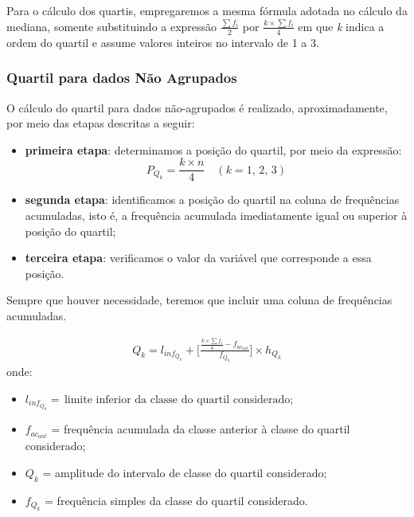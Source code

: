 Para o cálculo dos quartis, empregaremos a mesma fórmula adotada no cálculo da mediana, somente substituindo a expressão \(\frac{\sum f_i}{2}\) por \(\frac{k\times \sum f_i}{4}\) em que \textit{k} indica a ordem do quartil e assume valores inteiros no intervalo de 1 a 3.

\subsubsection{Quartil para dados Não Agrupados}

O cálculo do quartil para dados não-agrupados é realizado, aproximadamente, por meio das etapas descritas a seguir:

\begin{itemize}
    \item \textbf{primeira etapa}: determinamos a posição do quartil, por meio da expressão:
    \[
        P_{Q_k}=\frac{k\times n}{4}\quad (k=1,\,2,\,3)
    \]
    \item \textbf{segunda etapa}: identificamos a posição do quartil na coluna de frequências acumuladas, isto é, a frequência acumulada imediatamente igual ou superior à posição do quartil;
    \item \textbf{terceira etapa}: verificamos o valor da variável que corresponde a essa posição.
\end{itemize}

Sempre que houver necessidade, teremos que incluir uma coluna de frequências acumuladas.


\begin{align*}
    Q_k=l_{inf_{Q_k}}+\Bigg[\frac{\frac{k\times \sum f_i}{4}-f_{ac_{ant}}}{f_{Q_k}}\Bigg]\times h_{Q_k}
\end{align*}
onde:
\begin{itemize}
    \item \(l_{inf_{Q_k}}=\,\text{limite inferior da classe do quartil considerado}\);
    \item \(f_{ac_{ant}}\) =  frequência acumulada da classe anterior à classe do quartil considerado;
    \item \({Q_k}\) = amplitude do intervalo de classe do quartil considerado;
    \item \(f_{Q_k}\) = frequência simples da classe do quartil considerado.
\end{itemize}

